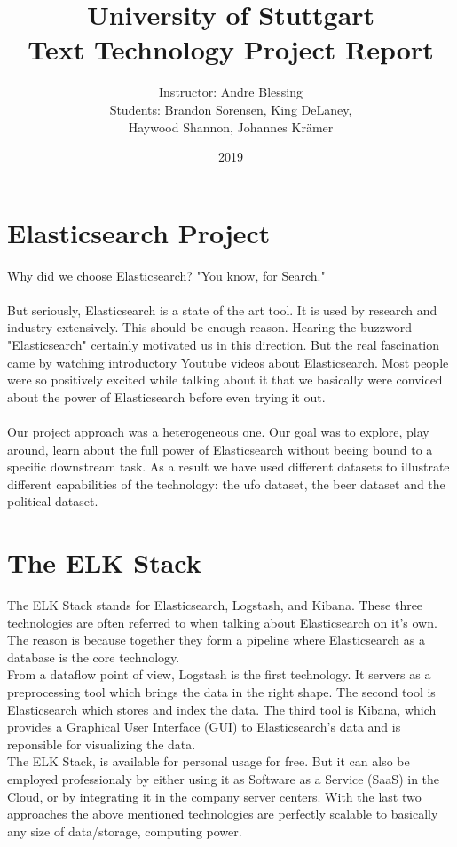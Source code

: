 \documentclass[bibliography=totoc]{article}
\title{University of Stuttgart \vspace{1em}\\Text Technology Project Report}
\author{Instructor: Andre Blessing\\Students: Brandon Sorensen, King DeLaney, \\Haywood Shannon, Johannes Krämer}
\date{2019}
\begin{document}
\maketitle


\section{Elasticsearch Project}
Why did we choose Elasticsearch? "You know, for Search."
\\
\\
But seriously, Elasticsearch is a state of the art tool. It is used by 
research and industry extensively. This should be enough reason. Hearing the buzzword "Elasticsearch" 
certainly motivated us in this direction. But the real fascination came by watching
introductory Youtube videos about Elasticsearch. Most people were so positively 
excited while talking about it that we basically were conviced about 
the power of Elasticsearch before even trying it out.
\\  
\\
Our project approach was a heterogeneous one. Our goal was to explore, play around, learn about the full power of 
Elasticsearch without beeing bound to a specific downstream task.
As a result we have used different datasets to illustrate different capabilities of the technology:
the ufo dataset, the beer dataset and the political dataset.

\section{The ELK Stack}
The ELK Stack stands for Elasticsearch, Logstash, and Kibana.
These three technologies are often referred to when talking about Elasticsearch
on it's own. The reason is because together they form a pipeline where
Elasticsearch as a database is the core technology.
\\
From a dataflow point of view, Logstash is the first technology. It servers
as a preprocessing tool which brings the data in the right shape. The second 
tool is Elasticsearch which stores and index the data. The third tool is 
Kibana, which provides a Graphical User Interface (GUI) to Elasticsearch's data 
and is reponsible for visualizing the data. 
\\
The ELK Stack, is available for personal usage for free. But it can also be 
employed professionaly by either using it as Software as a Service (SaaS) in the Cloud,
or by integrating it in the company server centers. With the last two approaches 
the above mentioned technologies are perfectly scalable to basically any size of data/storage,
computing power.
\end{document}
